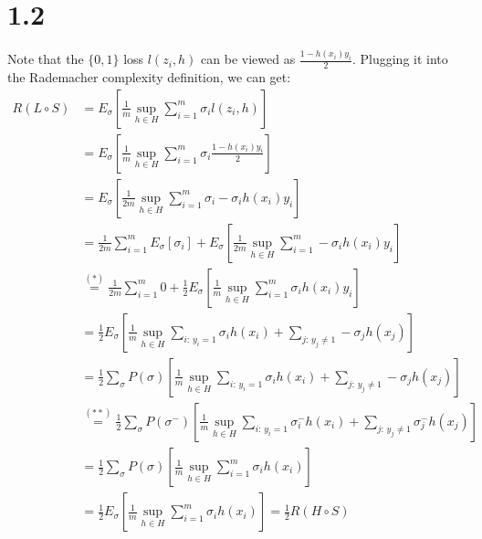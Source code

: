 \documentclass{article}
\begin{document}
\section*{1.2}
Note that the $\{0,1\}$ loss $l(z_i, h)$ can be viewed as $\frac{1-h(x_i)y_i}{2}$. Plugging it into the Rademacher complexity definition, we can get:
\begin{align*}
    R(L\circ S) &= E_\sigma \left[ \frac{1}{m}\sup_{h \in H}\sum_{i=1}^m \sigma_i l(z_i, h) \right] \\ &= E_\sigma \left[ \frac{1}{m}\sup_{h \in H}\sum_{i=1}^m \sigma_i \frac{1-h(x_i)y_i}{2} \right] \\ &= E_\sigma \left[ \frac{1}{2m}\sup_{h \in H}\sum_{i=1}^m \sigma_i - \sigma_i h(x_i)y_i \right] \\ 
    &= \frac{1}{2m}\sum_{i=1}^mE_\sigma\left[\sigma_i\right] + E_\sigma\left[\frac{1}{2m}\sup_{h\in H}\sum_{i=1}^m -\sigma_i h(x_i)y_i\right] \\
    &\stackrel{(*)}{=} \frac{1}{2m}\sum_{i=1}^m 0 + \frac{1}{2}E_\sigma\left[\frac{1}{m}\sup_{h\in H}\sum_{i=1}^m \sigma_i h(x_i)y_i\right] \\
    &= \frac{1}{2}E_\sigma\left[\frac{1}{m}\sup_{h\in H}\sum_{i: \, y_i=1} \sigma_i h(x_i) + \sum_{j: \, y_j\neq1} -\sigma_j h(x_j)\right] \\ 
    &= \frac{1}{2}\sum_{\sigma} P(\sigma)\left[ \frac{1}{m}\sup_{h\in H}\sum_{i: \, y_i=1} \sigma_i h(x_i) + \sum_{j: \, y_j\neq1} -\sigma_j h(x_j) \right] \\
    &\stackrel{(**)}{=} \frac{1}{2}\sum_{\sigma} P(\sigma^-)\left[ \frac{1}{m}\sup_{h\in H}\sum_{i: \, y_i=1} \sigma^-_i h(x_i) + \sum_{j: \, y_j\neq1} \sigma^-_j h(x_j) \right] \\
    &= \frac{1}{2}\sum_{\sigma} P(\sigma)\left[\frac{1}{m}\sup_{h\in H}\sum_{i=1}^m \sigma_i h(x_i)\right] \\
    &= \frac{1}{2}E_\sigma\left[\frac{1}{m}\sup_{h\in H}\sum_{i=1}^m \sigma_i h(x_i)\right] = \frac{1}{2}R(H \circ S)
\end{align*}
\end{document}
